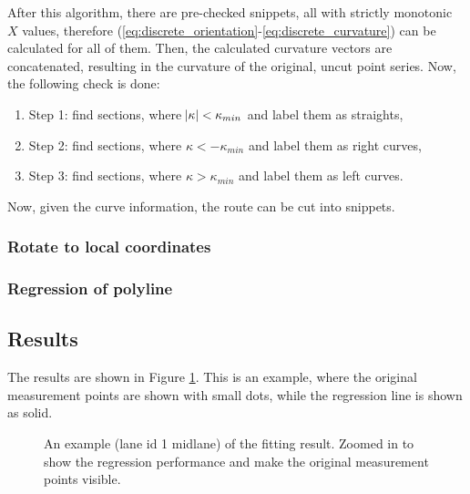 \documentclass[sn-mathphys-num]{sn-jnl}%
\begin{document}
After this algorithm, there are pre-checked snippets, all with strictly monotonic $X$ values, therefore (\ref{eq:discrete_orientation}-\ref{eq:discrete_curvature}) can be calculated for all of them. Then, 
the calculated curvature vectors are concatenated, resulting in the curvature of the original, uncut point series. Now, the following check is done:
\begin{enumerate}
    \item Step 1: find sections, where $\abs{\kappa} < \kappa_{min}$ and label them as straights,
    \item Step 2: find sections, where $\kappa < -\kappa_{min}$ and label them as right curves,
    \item Step 3: find sections, where $\kappa > \kappa_{min}$ and label them as left curves.
\end{enumerate}
Now, given the curve information, the route can be cut into snippets.

\subsubsection{Rotate to local coordinates}

\subsubsection{Regression of polyline}

\subsection{Results}
The results are shown in Figure \ref{fig:fittedLines_zoomed}. This is an example, where the original measurement points are shown with small dots, while the regression line is shown as solid.
\begin{figure}[h]
    \caption{An example (lane id 1 midlane) of the fitting result. Zoomed in to show the regression performance and make the original measurement points visible.}
    \label{fig:fittedLines_zoomed}
\end{figure}
\end{document}
